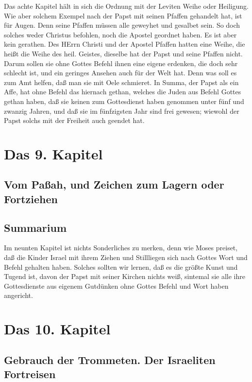 Das achte Kapitel hält in sich die Ordnung mit der Leviten Weihe oder Heiligung. Wie aber solchem Exempel nach der Papst mit seinen Pfaffen gehandelt hat, ist für Augen. Denn seine Pfaffen müssen alle geweyhet und gesalbet sein. So doch solches weder Christus befohlen, noch die Apostel geordnet haben. Es ist aber kein gerathen. Des HErrn Christi und der Apostel Pfaffen hatten eine Weihe, die heißt die Weihe des heil. Geistes, dieselbe hat der Papst und seine Pfaffen nicht. Darum sollen sie ohne Gottes Befehl ihnen eine eigene erdenken, die doch sehr schlecht ist, und ein geringes Ansehen auch für der Welt hat. Denn was soll es zum Amt helfen, daß man sie mit Oele schmieret. In Summa, der Papst als ein Affe, hat ohne Befehl das hiernach gethan, welches die Juden aus Befehl Gottes gethan haben, daß sie keinen zum Gottesdienst haben genommen unter fünf und zwanzig Jahren, und daß sie im fünfzigsten Jahr sind frei gewesen; wiewohl der Papst solchs mit der Freiheit auch geendet hat.

\chapter{Das 9. Kapitel}

\section{Vom Paßah, und Zeichen zum Lagern oder Fortziehen}

\section{Summarium}

Im neunten Kapitel ist nichts Sonderliches zu merken, denn wie Moses preiset, daß die Kinder Israel mit ihrem Ziehen und Stillliegen sich nach Gottes Wort und Befehl gehalten haben. Solches sollten wir lernen, daß es die größte Kunst und Tugend ist, davon der Papst mit seiner Kirchen nichts weiß, sintemal sie alle ihre Gottesdienste aus eigenem Gutdünken ohne Gottes Befehl und Wort haben angericht.

\chapter{Das 10. Kapitel}

\section{Gebrauch der Trommeten. Der Israeliten Fortreisen}

